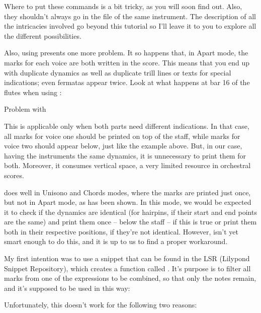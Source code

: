 \documentclass[../../LilyPond-Tutorials]{subfiles}
\begin{document}
Where to put these commands is a bit tricky, as you will soon find out.
Also, they shouldn't always go in the file of the same instrument.
The description of all the intricacies involved go beyond this tutorial so I'll leave it to you to explore all the different possibilities.

Also, using  presents one more problem.
It so happens that, in Apart mode, the marks for each voice are both written in the score.
This means that you end up with duplicate dynamics as well as duplicate trill lines or texts for special indications; even fermatas appear twice.
Look at what happens at bar 16 of the flutes when using :

\begin{musicExample}
    \caption{Problem with }
\label{xmp:partcombine-example-one}
\end{musicExample}

This is applicable only when both parts need different indications.
In that case, all marks for voice one should be printed on top of the staff, while marks for voice two should appear below, just like the example above.
But, in our case, having the instruments the same dynamics, it is unnecessary to print them for both.
Moreover, it consumes vertical space, a very limited resource in orchestral scores.

 does well in Unisono and Chords modes, where the marks are printed just once, but not in Apart mode, as has been shown.
In this mode, we would be expected it to check if the dynamics are identical (for hairpins, if their start and end points are the same) and print them once -- below the staff -- if this is true or print them both in their respective positions, if they're not identical.
However,  isn't yet smart enough to do this, and it is up to us to find a proper workaround.

My first intention was to use a snippet that can be found in the LSR (Lilypond Snippet Repository),  which creates a function called .
It's purpose is to filter all marks from one of the expressions to be combined, so that only the notes remain, and it's supposed to be used in this way:

\begin{lilypondcode}
\partCombine { \ExpressionOne \filtermusic \ExpressionTwo }
\end{lilypondcode}

Unfortunately, this doesn't work for the following two reasons:
\end{document}
